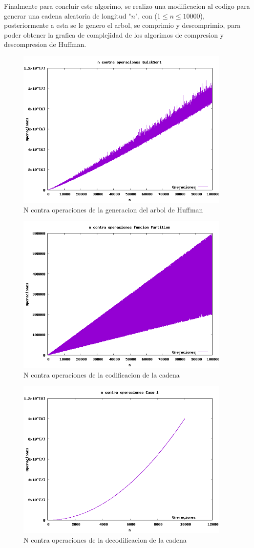 \documentclass[spanish]{article}
\begin{document}
	Finalmente para concluir este algorimo, se realizo una modificacion al codigo para generar una cadena aleatoria de longitud "$n$", con (1$\leq n\leq 10000$), posteriormente a esta se le genero el arbol, se comprimio y descomprimio, para poder obtener la grafica de complejidad de los algorimos de compresion y descompresion de Huffman.
	\begin{figure}[H]
		\centering
		\includegraphics[width=400px,height=300px]{grafica1}
		\caption{N contra operaciones de la generacion del arbol de Huffman}
	\end{figure}
	\begin{figure}[H]
		\centering
		\includegraphics[width=400px,height=300px]{grafica2}
		\caption{N contra operaciones de la codificacion de la cadena}
	\end{figure}
	\begin{figure}[H]
		\centering
		\includegraphics[width=400px,height=300px]{grafica3}
		\caption{N contra operaciones de la decodificacion de la cadena}
	\end{figure}
\end{document}
